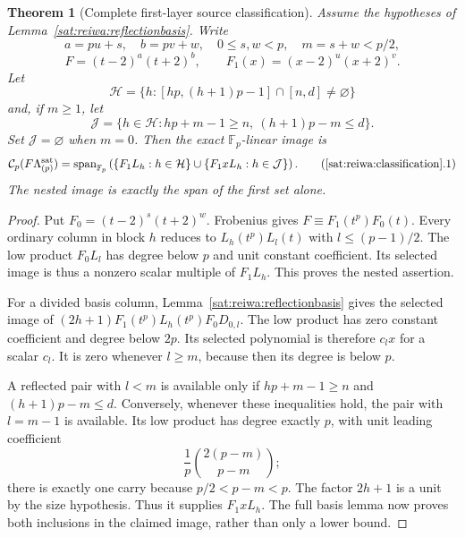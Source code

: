 \documentclass[11pt,a4paper]{article}
\numberwithin{equation}{section}
\newtheorem{theorem}{Theorem}[section]
\theoremstyle{definition}\newtheorem{definition}[theorem]{Definition}
\theoremstyle{remark}\newtheorem{remark}[theorem]{Remark}
\begin{document}
\begin{theorem}[Complete first-layer source classification]
\label{sat:reiwa:classification}
Assume the hypotheses of Lemma~\ref{sat:reiwa:reflectionbasis}. Write
\[
 a=pu+s,\quad b=pv+w,\quad 0\le s,w<p,\quad m=s+w<p/2,
\]
\[
 F=(t-2)^a(t+2)^b,\qquad F_1(x)=(x-2)^u(x+2)^v.
\]
Let
\[
 \mathcal H=\{h:[hp,(h+1)p-1]\cap[n,d]\ne\varnothing\}
\]
and, if $m\ge1$, let
\[
 \mathcal J=\{h\in\mathcal H:hp+m-1\ge n,
                         \ (h+1)p-m\le d\}.
\]
Set $\mathcal J=\varnothing$ when $m=0$. Then the exact
$\mathbb F_p$-linear image is
\[
 \mathcal C_p(F\Lambda^{\rm sat}_{(p)})
 =\operatorname{span}_{\mathbb F_p}
   \left(\{F_1L_h:h\in\mathcal H\}
         \cup\{F_1xL_h:h\in\mathcal J\}\right).       \tag{\ref{sat:reiwa:classification}.1}
\]
The nested image is exactly the span of the first set alone.
\end{theorem}
\begin{proof}
Put $F_0=(t-2)^s(t+2)^w$. Frobenius gives
$F\equiv F_1(t^p)F_0(t)$. Every ordinary column in block $h$
reduces to $L_h(t^p)L_l(t)$ with $l\le(p-1)/2$.
The low product $F_0L_l$ has degree below $p$ and unit constant
coefficient. Its selected image is thus a nonzero scalar multiple
of $F_1L_h$. This proves the nested assertion.

For a divided basis column, Lemma~\ref{sat:reiwa:reflectionbasis}
gives the selected image of
$(2h+1)F_1(t^p)L_h(t^p)F_0D_{0,l}$.
The low product has zero constant coefficient and degree below
$2p$. Its selected polynomial is therefore $c_lx$ for a scalar
$c_l$. It is zero whenever $l\ge m$, because then its degree is
below $p$.

A reflected pair with $l<m$ is available only if
$hp+m-1\ge n$ and $(h+1)p-m\le d$. Conversely, whenever these
inequalities hold, the pair with $l=m-1$ is available. Its low
product has degree exactly $p$, with unit leading coefficient
\[
 \frac1p\binom{2(p-m)}{p-m};
\]
there is exactly one carry because $p/2<p-m<p$.
The factor $2h+1$ is a unit by the size hypothesis. Thus it
supplies $F_1xL_h$. The full basis lemma now proves both
inclusions in the claimed image, rather than only a lower bound.
\end{proof}
\end{document}
